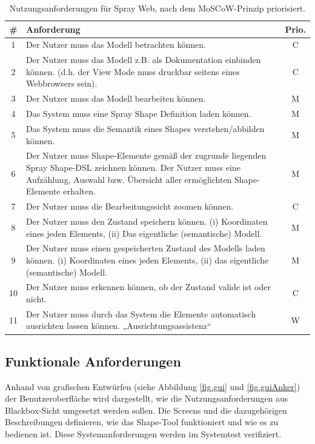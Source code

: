 \begin{table}[tbp]
  \begin{tabular}{ | c | p{10cm} | c | }
    \hline
    \# & Anforderung & Prio. \\ \hline \hline
    1  & Der Nutzer muss das Modell betrachten können. & C \\ \hline
    2  & Der Nutzer muss das Modell z.B. als Dokumentation einbinden können. (d.h. der View Mode muss druckbar seitens eines Webbrowsers sein). & C \\ \hline
    3  & Der Nutzer muss das Modell bearbeiten können. & M \\ \hline
    4  & Das System muss eine Spray Shape Definition laden können. & M \\ \hline
    5  & Das System muss die Semantik eines Shapes verstehen/abbilden können. & M \\ \hline
    6  & Der Nutzer muss Shape-Elemente gemäß der zugrunde liegenden Spray Shape-DSL zeichnen können. Der Nutzer muss eine Aufzählung, Auswahl bzw. Übersicht aller ermöglichten Shape-Elemente erhalten. & M \\ \hline
    7  & Der Nutzer muss die Bearbeitungssicht zoomen können. & C \\ \hline
    8  & Der Nutzer muss den Zustand speichern können. (i) Koordinaten eines jeden Elements, (ii) Das eigentliche (semantische) Modell. & M \\ \hline
    9 & Der Nutzer muss einen gespeicherten Zustand des Modells laden können.
(i) Koordinaten eines jeden Elements, (ii)
das eigentliche (semantische) Modell. & M \\ \hline
    10 & Der Nutzer muss erkennen können, ob der Zustand valide ist oder nicht. & C \\ \hline
    11 & Der Nutzer muss durch das System die Elemente automatisch ausrichten lassen können. „Ausrichtungsassistenz“ & W \\
    \hline  
  \end{tabular}
  \caption{Nutzungsanforderungen für Spray Web,
           nach dem MoSCoW-Prinzip priorisiert.}\label{tbl.nutz}
\end{table}

\subsection{Funktionale Anforderungen}\label{sec.funcAnforderung}

Anhand von grafischen Entwürfen (siehe Abbildung
\ref{fig.gui} und \ref{fig.guiAnker}) der Benutzeroberfläche wird dargestellt,
wie die Nutzungsanforderungen aus Blackbox-Sicht umgesetzt werden sollen.
Die Screens und die dazugehörigen Beschreibungen definieren, wie das Shape-Tool 
funktioniert und wie es zu bedienen ist. Diese Systemanforderungen werden
im Systemtest verifiziert.


